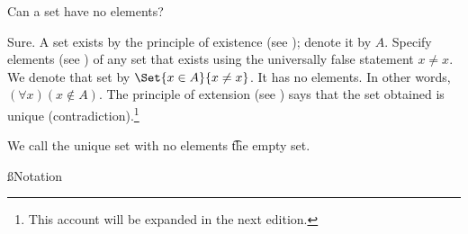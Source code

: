 

Can a set have no elements?


Sure.
A set exists by the principle of existence (see ); denote it by $A$.
Specify elements (see ) of any set that exists using the universally false statement $x \neq x$.
We denote that set by $\Set{x \in A}{x \neq x}$.
It has no elements.
In other words, $(\forall x)(x \not \in A)$.
The principle of extension (see ) says that the set obtained is unique (contradiction).\footnote{This account will be expanded in the next edition.}

\begin{definition}
	We call the unique set with no elements \t{the empty set}.
	\label{empty_set:definition}
\end{definition}



%
%

\ss{Notation}

